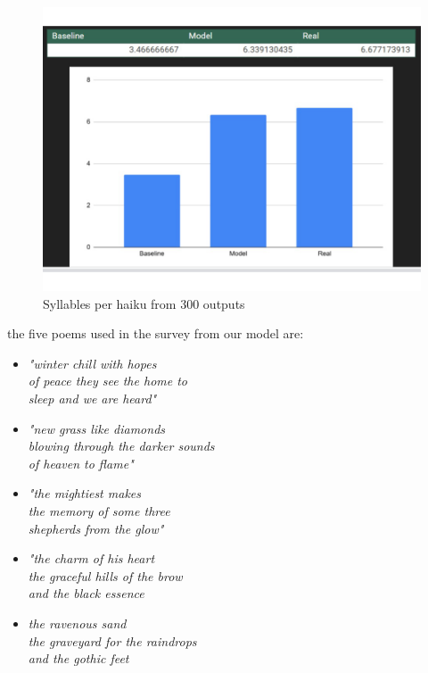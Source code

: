 \documentclass{article} %
\begin{document}
\begin{figure}[h]
  \begin{center}
  \includegraphics[width=1\textwidth]{Figs/survey_results.png}
  \end{center}
  \caption{Syllables per haiku from 300 outputs}
  \label{fig:plot2}
\end{figure}
\FloatBarrier

the five poems used in the survey from our model are:

\begin{itemize}


  \item \textit{"winter chill with hopes \\
  of peace they see the home to \\
  sleep and we are heard"}

  \item \textit{"new grass like diamonds \\
  blowing through the darker sounds \\
  of heaven to flame"}

  \item \textit{"the mightiest makes \\
  the memory of some three \\
  shepherds from the glow"}

  \item \textit{"the charm of his heart \\
  the graceful hills of the brow \\
  and the black essence}

  \item \textit{the ravenous sand \\
  the graveyard for the raindrops \\
  and the gothic feet}

\end{itemize}
\end{document}
